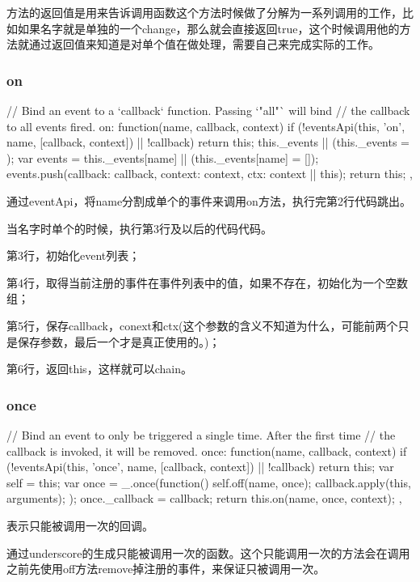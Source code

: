 方法的返回值是用来告诉调用函数这个方法时候做了分解为一系列调用的工作，比如如果名字就是单独的一个change，那么就会直接返回true，这个时候调用他的方法就通过返回值来知道是对单个值在做处理，需要自己来完成实际的工作。

\subsubsection{on}
\begin{JavaScript}
    // Bind an event to a `callback` function. Passing `"all"` will bind
    // the callback to all events fired.
    on: function(name, callback, context) {
      if (!eventsApi(this, 'on', name, [callback, context]) || !callback) return this;
      this._events || (this._events = {});
      var events = this._events[name] || (this._events[name] = []);
      events.push({callback: callback, context: context, ctx: context || this});
      return this;
    },
\end{JavaScript}
通过eventApi，将name分割成单个的事件来调用on方法，执行完第2行代码跳出。

当名字时单个的时候，执行第3行及以后的代码代码。

第3行，初始化event列表；

第4行，取得当前注册的事件在事件列表中的值，如果不存在，初始化为一个空数组；

第5行，保存callback，conext和ctx(这个参数的含义不知道为什么，可能前两个只是保存参数，最后一个才是真正使用的。)；

第6行，返回this，这样就可以chain。

\subsubsection{once}

\begin{JavaScript}
    // Bind an event to only be triggered a single time. After the first time
    // the callback is invoked, it will be removed.
    once: function(name, callback, context) {
      if (!eventsApi(this, 'once', name, [callback, context]) || !callback) return this;
      var self = this;
      var once = _.once(function() {
        self.off(name, once);
        callback.apply(this, arguments);
      });
      once._callback = callback;
      return this.on(name, once, context);
    },
\end{JavaScript}

表示只能被调用一次的回调。

通过underscore的生成只能被调用一次的函数。这个只能调用一次的方法会在调用之前先使用off方法remove掉注册的事件，来保证只被调用一次。


